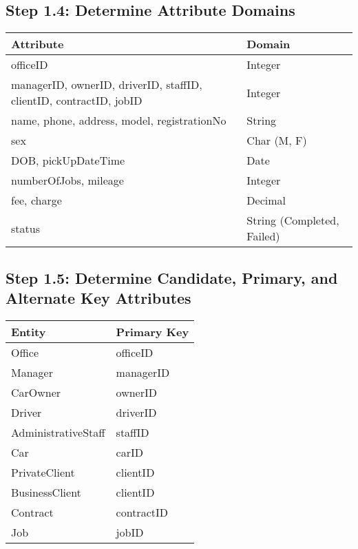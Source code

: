 \documentclass[a4paper,12pt]{article}
\begin{document}
\subsection*{Step 1.4: Determine Attribute Domains}
\begin{table}[H]
\centering
\begin{tabularx}{\textwidth}{|X|X|}
\hline
\rowcolor{blue!20} \textbf{Attribute} & \textbf{Domain} \\
\hline
officeID & Integer \\
\hline
managerID, ownerID, driverID, staffID, clientID, contractID, jobID & Integer \\
\hline
name, phone, address, model, registrationNo & String \\
\hline
sex & Char (M, F) \\
\hline
DOB, pickUpDateTime & Date \\
\hline
numberOfJobs, mileage & Integer \\
\hline
fee, charge & Decimal \\
\hline
status & String (Completed, Failed) \\
\hline
\end{tabularx}
\end{table}

\subsection*{Step 1.5: Determine Candidate, Primary, and Alternate Key Attributes}
\begin{table}[H]
\centering
\begin{tabularx}{\textwidth}{|X|X|}
\hline
\rowcolor{blue!20} \textbf{Entity} & \textbf{Primary Key} \\
\hline
Office & officeID \\
\hline
Manager & managerID \\
\hline
CarOwner & ownerID \\
\hline
Driver & driverID \\
\hline
AdministrativeStaff & staffID \\
\hline
Car & carID \\
\hline
PrivateClient & clientID \\
\hline
BusinessClient & clientID \\
\hline
Contract & contractID \\
\hline
Job & jobID \\
\hline
\end{tabularx}
\end{table}
\end{document}
